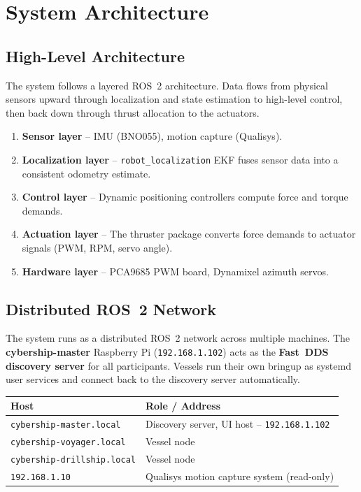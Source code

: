 \documentclass[12pt,a4paper]{article}
\begin{document}
	\section{System Architecture}
	\label{sec:architecture}
	
	\subsection{High-Level Architecture}
	
	The system follows a layered ROS~2 architecture. Data flows from physical sensors upward through
	localization and state estimation to high-level control, then back down through thrust allocation to
	the actuators.
	
	\begin{enumerate}
		\item \textbf{Sensor layer} -- IMU (BNO055), motion capture (Qualisys).
		\item \textbf{Localization layer} -- \texttt{robot\_localization} EKF fuses sensor data into
		a consistent odometry estimate.
		\item \textbf{Control layer} -- Dynamic positioning controllers compute force and torque demands.
		\item \textbf{Actuation layer} -- The thruster package converts force demands to actuator
		signals (PWM, RPM, servo angle).
		\item \textbf{Hardware layer} -- PCA9685 PWM board, Dynamixel azimuth servos.
	\end{enumerate}
	
	\subsection{Distributed ROS~2 Network}
	
	The system runs as a distributed ROS~2 network across multiple machines. The
	\textbf{cybership-master} Raspberry Pi (\texttt{192.168.1.102}) acts as the
	\textbf{Fast~DDS discovery server} for all participants. Vessels run their own bringup as
	systemd user services and connect back to the discovery server automatically.
	
	\begin{center}
		\begin{tabular}{ll}
			\toprule
			\textbf{Host}                      & \textbf{Role / Address}                             \\
			\midrule
			\texttt{cybership-master.local}    & Discovery server, UI host -- \texttt{192.168.1.102} \\
			\texttt{cybership-voyager.local}   & Vessel node                                         \\
			\texttt{cybership-drillship.local} & Vessel node                                         \\
			\texttt{192.168.1.10}              & Qualisys motion capture system (read-only)          \\
			\bottomrule
		\end{tabular}
	\end{center}
	
\end{document}
